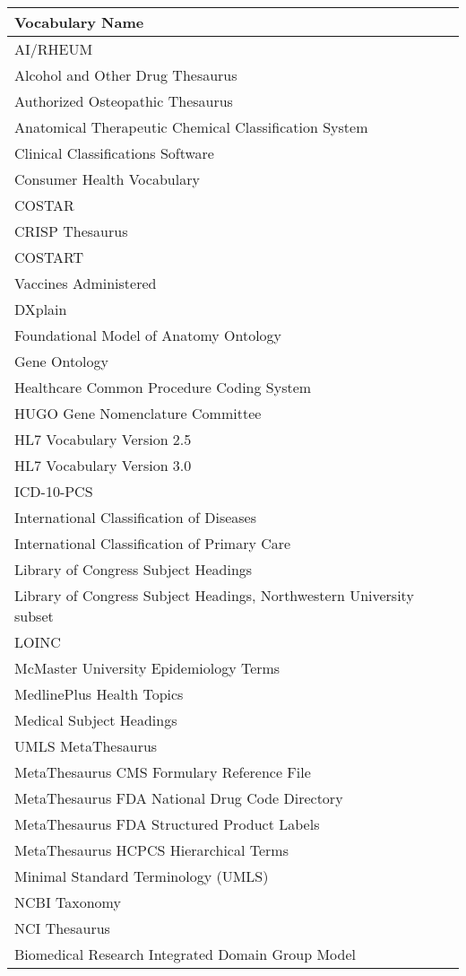 \documentclass[Report.tex]{subfiles}
\begin{document}
\begin{longtable}{| p{} |}\hline
\textbf{Vocabulary Name}\\ \hline
AI/RHEUM\\
Alcohol and Other Drug Thesaurus\\
Authorized Osteopathic Thesaurus\\
Anatomical Therapeutic Chemical Classification System\\
Clinical Classifications Software\\
Consumer Health Vocabulary\\
COSTAR\\
CRISP Thesaurus\\
COSTART\\
Vaccines Administered\\
DXplain\\
Foundational Model of Anatomy Ontology\\
Gene Ontology\\
Healthcare Common Procedure Coding System\\
HUGO Gene Nomenclature Committee\\
HL7 Vocabulary Version 2.5\\
HL7 Vocabulary Version 3.0\\
ICD-10-PCS\\
International Classification of Diseases\\
International Classification of Primary Care\\
Library of Congress Subject Headings\\
Library of Congress Subject Headings, Northwestern University subset\\
LOINC\\
McMaster University Epidemiology Terms\\
MedlinePlus Health Topics\\
Medical Subject Headings\\
UMLS MetaThesaurus\\
MetaThesaurus CMS Formulary Reference File\\
MetaThesaurus FDA National Drug Code Directory\\
MetaThesaurus FDA Structured Product Labels\\
MetaThesaurus HCPCS Hierarchical Terms\\
Minimal Standard Terminology (UMLS)\\
NCBI Taxonomy\\
NCI Thesaurus\\
Biomedical Research Integrated Domain Group Model\\

\end{longtable}
\end{document}
